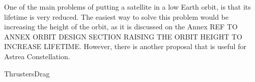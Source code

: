 
One of the main problems of putting a satellite in a low Earth orbit, is that its lifetime is very reduced. The easiest way to solve this problem would be increasing the height of the orbit, as it is discussed on the Annex REF TO ANNEX ORBIT DESIGN SECTION RAISING THE ORBIT HEIGHT TO INCREASE LIFETIME. However, there is another proposal that is useful for Astrea Constellation.

{ThrustersDrag}